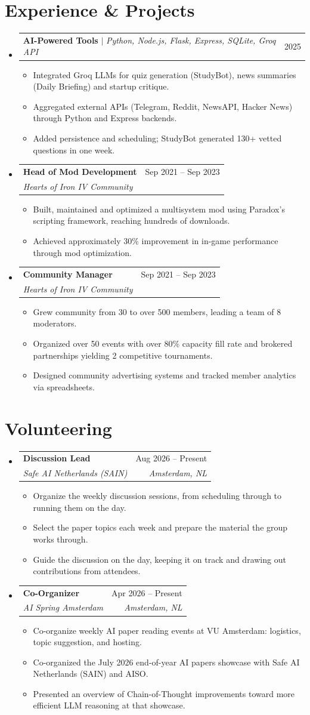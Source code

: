 \documentclass[a4paper,11pt]{article}
\makeatletter
\newcommand{\resumeItem}[1]{\item\small{{#1 \vspace{-2pt}}}}
\newcommand{\resumeSubheading}[4]{\vspace{-2pt}\item
  \begin{tabular*}{0.97\textwidth}[t]{l@{\extracolsep{\fill}}r}
    \textbf{#1} & #2 \\ \textit{\small#3} & \textit{\small #4} \\
  \end{tabular*}\vspace{-7pt}}
\newcommand{\resumeProjectHeading}[2]{\item
  \begin{tabular*}{0.97\textwidth}{l@{\extracolsep{\fill}}r}
    \small#1 & #2 \\
  \end{tabular*}\vspace{-7pt}}
\newcommand{\resumeSubHeadingListStart}{\begin{itemize}[leftmargin=0.15in, label={}]}
\newcommand{\resumeSubHeadingListEnd}{\end{itemize}}
\newcommand{\resumeItemListStart}{\begin{itemize}[noitemsep,topsep=1pt]}
\newcommand{\resumeItemListEnd}{\end{itemize}\vspace{-5pt}}
\makeatother
\begin{document}
\section{Experience \& Projects}
\resumeSubHeadingListStart
  \resumeProjectHeading{\textbf{AI-Powered Tools} $|$ \emph{Python, Node.js, Flask, Express, SQLite, Groq API}}{2025}
  \resumeItemListStart
    \resumeItem{Integrated Groq LLMs for quiz generation (StudyBot), news summaries (Daily Briefing) and startup critique.}
    \resumeItem{Aggregated external APIs (Telegram, Reddit, NewsAPI, Hacker News) through Python and Express backends.}
    \resumeItem{Added persistence and scheduling; StudyBot generated 130+ vetted questions in one week.}
  \resumeItemListEnd
  \resumeSubheading{Head of Mod Development}{Sep 2021 -- Sep 2023}{Hearts of Iron IV Community}{}
  \resumeItemListStart
    \resumeItem{Built, maintained and optimized a multisystem mod using Paradox's scripting framework, reaching hundreds of downloads.}
    \resumeItem{Achieved approximately 30\% improvement in in-game performance through mod optimization.}
  \resumeItemListEnd
  \resumeSubheading{Community Manager}{Sep 2021 -- Sep 2023}{Hearts of Iron IV Community}{}
  \resumeItemListStart
    \resumeItem{Grew community from 30 to over 500 members, leading a team of 8 moderators.}
    \resumeItem{Organized over 50 events with over 80\% capacity fill rate and brokered partnerships yielding 2 competitive tournaments.}
    \resumeItem{Designed community advertising systems and tracked member analytics via spreadsheets.}
  \resumeItemListEnd
\resumeSubHeadingListEnd

\section{Volunteering}
\resumeSubHeadingListStart
  \resumeSubheading{Discussion Lead}{Aug 2026 -- Present}{Safe AI Netherlands (SAIN)}{Amsterdam, NL}
  \resumeItemListStart
    \resumeItem{Organize the weekly discussion sessions, from scheduling through to running them on the day.}
    \resumeItem{Select the paper topics each week and prepare the material the group works through.}
    \resumeItem{Guide the discussion on the day, keeping it on track and drawing out contributions from attendees.}
  \resumeItemListEnd
  \resumeSubheading{Co-Organizer}{Apr 2026 -- Present}{AI Spring Amsterdam}{Amsterdam, NL}
  \resumeItemListStart
    \resumeItem{Co-organize weekly AI paper reading events at VU Amsterdam: logistics, topic suggestion, and hosting.}
    \resumeItem{Co-organized the July 2026 end-of-year AI papers showcase with Safe AI Netherlands (SAIN) and AISO.}
    \resumeItem{Presented an overview of Chain-of-Thought improvements toward more efficient LLM reasoning at that showcase.}
  \resumeItemListEnd
\resumeSubHeadingListEnd
\end{document}
